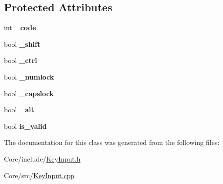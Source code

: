 \subsection*{Protected Attributes}
\begin{DoxyCompactItemize}
\item 
\hypertarget{classskl_1_1_key_input_ab7c445dee3b0c2de8c266dd7a2eb2b00}{}\label{classskl_1_1_key_input_ab7c445dee3b0c2de8c266dd7a2eb2b00} 
int {\bfseries \+\_\+code}
\item 
\hypertarget{classskl_1_1_key_input_a537fbedb395a46169c3c99af808691e1}{}\label{classskl_1_1_key_input_a537fbedb395a46169c3c99af808691e1} 
bool {\bfseries \+\_\+shift}
\item 
\hypertarget{classskl_1_1_key_input_a5efcbdadc726872cae91386163c84bdf}{}\label{classskl_1_1_key_input_a5efcbdadc726872cae91386163c84bdf} 
bool {\bfseries \+\_\+ctrl}
\item 
\hypertarget{classskl_1_1_key_input_a9c3c98ec877767c743853c7367e4747c}{}\label{classskl_1_1_key_input_a9c3c98ec877767c743853c7367e4747c} 
bool {\bfseries \+\_\+numlock}
\item 
\hypertarget{classskl_1_1_key_input_a17d3c07d17ecd1195078790cf712f4cb}{}\label{classskl_1_1_key_input_a17d3c07d17ecd1195078790cf712f4cb} 
bool {\bfseries \+\_\+capslock}
\item 
\hypertarget{classskl_1_1_key_input_a0bb09cf95828ac5fb0df5a62e7559423}{}\label{classskl_1_1_key_input_a0bb09cf95828ac5fb0df5a62e7559423} 
bool {\bfseries \+\_\+alt}
\item 
\hypertarget{classskl_1_1_key_input_a4205ff6d7423d192ab8bc97bd0874d99}{}\label{classskl_1_1_key_input_a4205ff6d7423d192ab8bc97bd0874d99} 
bool {\bfseries is\+\_\+valid}
\end{DoxyCompactItemize}


The documentation for this class was generated from the following files\+:\begin{DoxyCompactItemize}
\item 
Core/include/\hyperlink{_key_input_8h}{Key\+Input.\+h}\item 
Core/src/\hyperlink{_key_input_8cpp}{Key\+Input.\+cpp}\end{DoxyCompactItemize}
